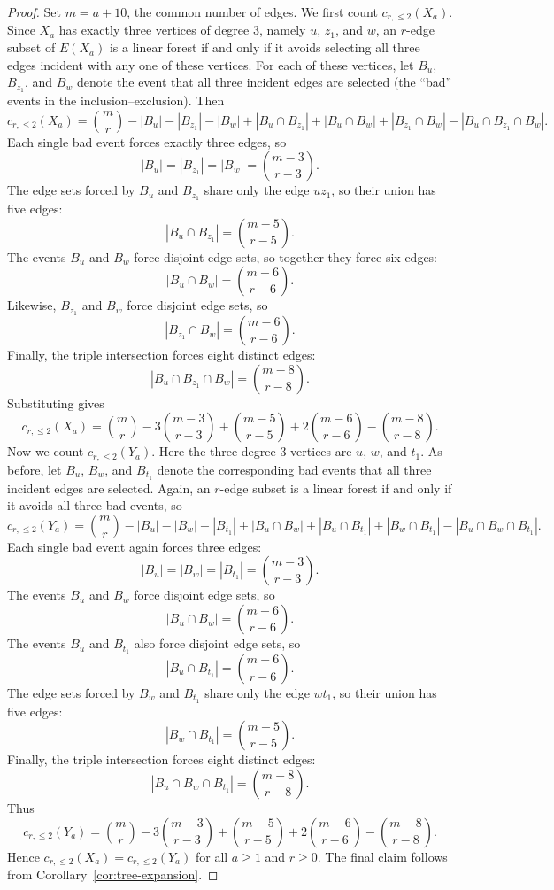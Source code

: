 \documentclass[10pt,a4paper]{amsart}
\theoremstyle{definition}
\begin{document}
\begin{proof}
Set $m=a+10$, the common number of edges. We first count $c_{r,\leq 2}(X_a)$. Since $X_a$ has exactly three vertices of degree $3$, namely $u$, $z_1$, and $w$, an $r$-edge subset of $E(X_a)$ is a linear forest if and only if it avoids selecting all three edges incident with any one of these vertices. For each of these vertices, let $B_u$, $B_{z_1}$, and $B_w$ denote the event that all three incident edges are selected (the ``bad'' events in the inclusion--exclusion). Then
\[
c_{r,\leq 2}(X_a)=\binom{m}{r}-|B_u|-|B_{z_1}|-|B_w|
+|B_u\cap B_{z_1}|+|B_u\cap B_w|+|B_{z_1}\cap B_w|
-|B_u\cap B_{z_1}\cap B_w|.
\]
Each single bad event forces exactly three edges, so
\[
|B_u|=|B_{z_1}|=|B_w|=\binom{m-3}{r-3}.
\]
The edge sets forced by $B_u$ and $B_{z_1}$ share only the edge
$uz_1$, so their union has five edges:
\[
|B_u\cap B_{z_1}|=\binom{m-5}{r-5}.
\]
The events $B_u$ and $B_w$ force disjoint edge sets, so together they force six edges:
\[
|B_u\cap B_w|=\binom{m-6}{r-6}.
\]
Likewise, $B_{z_1}$ and $B_w$ force disjoint edge sets, so
\[
|B_{z_1}\cap B_w|=\binom{m-6}{r-6}.
\]
Finally, the triple intersection forces eight distinct edges:
\[
|B_u\cap B_{z_1}\cap B_w|=\binom{m-8}{r-8}.
\]
Substituting gives
\[
c_{r,\leq 2}(X_a)
=
\binom{m}{r}
-3\binom{m-3}{r-3}
+\binom{m-5}{r-5}
+2\binom{m-6}{r-6}
-\binom{m-8}{r-8}.
\]
Now we count $c_{r,\leq 2}(Y_a)$. Here the three degree-$3$ vertices are $u$, $w$, and $t_1$. As before, let $B_u$, $B_w$, and $B_{t_1}$ denote the corresponding bad events that all three incident edges are selected. Again, an $r$-edge subset is a linear forest if and only if it avoids all three bad events, so
\[
c_{r,\leq 2}(Y_a)=\binom{m}{r}-|B_u|-|B_w|-|B_{t_1}|
+|B_u\cap B_w|+|B_u\cap B_{t_1}|+|B_w\cap B_{t_1}|
-|B_u\cap B_w\cap B_{t_1}|.
\]
Each single bad event again forces three edges:
\[
|B_u|=|B_w|=|B_{t_1}|=\binom{m-3}{r-3}.
\]
The events $B_u$ and $B_w$ force disjoint edge sets, so
\[
|B_u\cap B_w|=\binom{m-6}{r-6}.
\]
The events $B_u$ and $B_{t_1}$ also force disjoint edge sets, so
\[
|B_u\cap B_{t_1}|=\binom{m-6}{r-6}.
\]
The edge sets forced by $B_w$ and $B_{t_1}$ share only the edge
$wt_1$, so their union has five edges:
\[
|B_w\cap B_{t_1}|=\binom{m-5}{r-5}.
\]
Finally, the triple intersection forces eight distinct edges:
\[
|B_u\cap B_w\cap B_{t_1}|=\binom{m-8}{r-8}.
\]
Thus
\[
c_{r,\leq 2}(Y_a)
=
\binom{m}{r}
-3\binom{m-3}{r-3}
+\binom{m-5}{r-5}
+2\binom{m-6}{r-6}
-\binom{m-8}{r-8}.
\]
Hence $c_{r,\leq 2}(X_a)=c_{r,\leq 2}(Y_a)$ for all $a\geq 1$ and $r\geq 0$. The final claim follows from Corollary~\ref{cor:tree-expansion}.
\end{proof}
\end{document}
